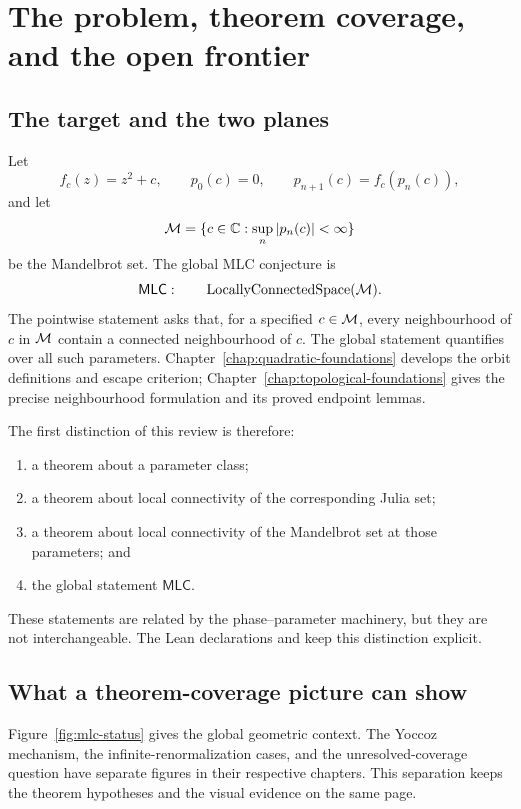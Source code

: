 \chapter{The problem, theorem coverage, and the open frontier}
\label{chap:scope}

\section{The target and the two planes}

Let
\[
 f_c(z)=z^2+c,\qquad p_0(c)=0,\qquad p_{n+1}(c)=f_c(p_n(c)),
\]
and let
\[
 \mathcal M=\{c\in\mathbb C:\sup_n |p_n(c)|<\infty\}
\]
be the Mandelbrot set.  The global MLC conjecture is
\[
 \mathsf{MLC}:\qquad \operatorname{LocallyConnectedSpace}(\mathcal M).
\]
The pointwise statement asks that, for a specified $c\in\mathcal M$, every
neighbourhood of $c$ in $\mathcal M$ contain a connected neighbourhood of $c$.
The global statement quantifies over all such parameters.
Chapter~\ref{chap:quadratic-foundations} develops the orbit definitions
and escape criterion; Chapter~\ref{chap:topological-foundations} gives
the precise neighbourhood formulation and its proved endpoint lemmas.

The first distinction of this review is therefore:
\begin{enumerate}
\item a theorem about a parameter class;
\item a theorem about local connectivity of the corresponding Julia set;
\item a theorem about local connectivity of the Mandelbrot set at those
      parameters; and
\item the global statement $\mathsf{MLC}$.
\end{enumerate}
These statements are related by the phase--parameter machinery, but they are
not interchangeable.  The Lean declarations
 and
 keep this distinction explicit.

\section{What a theorem-coverage picture can show}



Figure~\ref{fig:mlc-status} gives the global geometric context.
The Yoccoz mechanism, the infinite-renormalization cases, and the
unresolved-coverage question have separate figures in their respective
chapters.  This separation keeps the theorem hypotheses and the visual
evidence on the same page.

